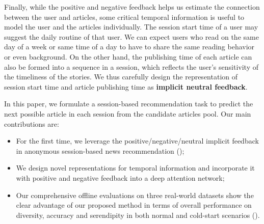 Finally, while the positive and negative feedback helps us estimate the 
connection between the user and articles, 
some critical temporal information is useful to model
the user and the articles individually. 
The session start time of a user may suggest
the daily routine of that user. We can expect users who read on
the same day of a week or same time of a day to have to
share the same reading behavior or even background.
On the other hand, the publishing time of each article can also be
formed into a sequence in a session, which reflects the user's sensitivity of 
the timeliness of the stories. We thus carefully design the representation of
session start time and article publishing time as 
\textbf{implicit neutral feedback}.


In this paper, we formulate a session-based recommendation task to 
predict the next possible article 
in each session from the candidate articles pool. Our main contributions are:
\begin{itemize} 
\item For the first time, we leverage the positive/negative/neutral implicit feedback 
in anonymous session-based news recommendation ();
\item We design novel representations for temporal information 
and incorporate it with positive and negative feedback 
into a deep attention network;
\item Our comprehensive offline evaluations on three real-world datasets 
show the clear advantage of our proposed method in terms of overall performance on 
diversity, accuracy and serendipity in both normal and 
cold-start scenarios ().
\end{itemize}
